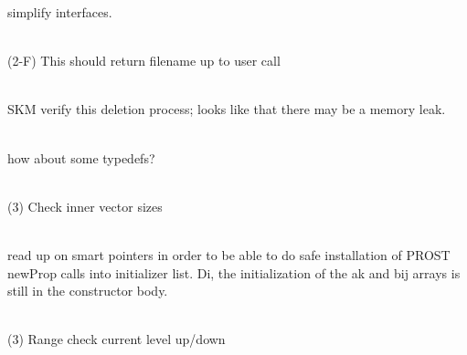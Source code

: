 \begin{DoxyRefList}
simplify interfaces. 
\item[Member \doxylink{classcsmp_1_1_v_t_u___interface_a550187f69deb23001160a45db987017e}{csmp\+::VTU\+\_\+\+Interface\texorpdfstring{$<$}{<} dim \texorpdfstring{$>$}{>}\+::Close\+File} (const std\+::string \&file\+Name, const std\+::string \&extension, \doxylink{classcsmp_1_1_x_m_l___document}{XML\+\_\+\+Document} \&)]\hfill \\
\label{todo__todo000135}%
%
(2-\/F) This should return filename up to user call  
\item[Member \doxylink{classcsmp_1_1_v_t_u___interface_a44003d0ae82d2922139f87f5daa264de}{csmp\+::VTU\+\_\+\+Interface\texorpdfstring{$<$}{<} dim \texorpdfstring{$>$}{>}\+::Delete\+Connectivity} ()]\hfill \\
\label{todo__todo000133}%
%
SKM verify this deletion process; looks like that there may be a memory leak.  
\item[Member \doxylink{classcsmp_1_1_v_t_u___interface_a449bb1d6134a23e15f50374afe65f37c}{csmp\+::VTU\+\_\+\+Interface\texorpdfstring{$<$}{<} dim \texorpdfstring{$>$}{>}\+::Get\+Connectivity\+Map} (const \doxylink{classcsmp_1_1_model_sub_domain}{Model\+Sub\+Domain$<$ dim, Element $>$} \&sub\+Domain)]\hfill \\
\label{todo__todo000008}%
%
how about some typedefs?  
\item[Member \doxylink{classcsmp_1_1_v_t_u___interface_a540acc0b6a1cd4590db5465488853782}{csmp\+::VTU\+\_\+\+Interface\texorpdfstring{$<$}{<} dim \texorpdfstring{$>$}{>}\+::Output\+Tensor\+To\+VTU} (const std\+::string \&file\+Name, const std\+::string \&property\+Caption, const std\+::vector\texorpdfstring{$<$}{<} std\+::vector$<$ double $>$ \texorpdfstring{$>$}{>} \&tensor)]\hfill \\
\label{todo__todo000134}%
%
(3) Check inner vector sizes  
\item[Member \doxylink{classcsmp_1_1_water_a25dbcb3664c0123565b84e01ce080b14}{csmp\+::Water\+::Water} (const double \&externaltemperature, const double \&externalpressure)]\hfill \\
\label{todo__todo000061}%
%
read up on smart pointers in order to be able to do safe installation of PROST new\+Prop calls into initializer list. Di, the initialization of the ak and bij arrays is still in the constructor body.  
\item[Class \doxylink{classcsmp_1_1_x_m_l___document}{csmp\+::XML\+\_\+\+Document} ]\hfill \\
\label{todo__todo000023}%
%
(3) Range check current level up/down 




\end{DoxyRefList}
